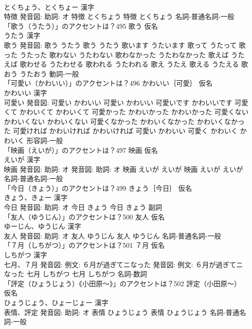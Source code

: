 \documentclass[8pt]{extreport}
\begin{document}
\begin{CJK}{UTF8}{min}
\\	とくちょう、とくちょー 漢字　
\\	特徴 発音図: 助詞: オ	特徴 とくちょう		特徴 とくちょう				名詞-普通名詞-一般 
\\	「歌う（うたう）」のアクセントは？495	歌う 仮名　
\\	うたう 漢字　
\\	歌う 発音図:	歌う うたう		歌う うたう 歌います うたいます 歌って うたって 歌った うたった 歌わない うたわない 歌わなかった うたわなかった 歌えば うたえば 歌わせる うたわせる 歌われる うたわれる 歌え うたえ 歌える うたえる 歌おう うたおう				動詞-一般 
\\	「可愛い（かわいい）」のアクセントは？496	かわいい｛可愛｝ 仮名　
\\	かわいい 漢字　
\\	可愛い 発音図:	可愛い かわいい		可愛い かわいい 可愛いです かわいいです 可愛くて かわいくて かわいくて 可愛かった かわいかった かわいかった 可愛くない かわいくない かわいくない 可愛くなかった かわいくなかった かわいくなかった 可愛ければ かわいければ かわいければ 可愛い かわいい 可愛く かわいく かわいく				形容詞-一般 
\\	「映画（えいが）」のアクセントは？497	映画 仮名　
\\	えいが 漢字　
\\	映画 発音図: 助詞: オ 発音図: 助詞: オ	映画 えいが えいが		映画 えいが えいが				名詞-普通名詞-一般 
\\	「今日（きょう）」のアクセントは？499	きょう｛今日｝ 仮名　
\\	きょう、きょー 漢字　
\\	今日 発音図: 助詞: オ	今日 きょう		今日 きょう				副詞 
\\	「友人（ゆうじん）」のアクセントは？500	友人 仮名　
\\	ゆーじん、ゆうじん 漢字　
\\	友人 発音図: 助詞: オ	友人 ゆうじん		友人 ゆうじん				名詞-普通名詞-一般 
\\	「７月（しちがつ）」のアクセントは？501	７月 仮名　
\\	しちがつ 漢字　
\\	七月、７月 発音図: 例文: ６月が過ぎてニなった 発音図: 例文: ６月が過ぎてニなった	七月 しちがつ		七月 しちがつ				名詞-数詞 
\\	「評定（ひょうじょう）《小田原〜》」のアクセントは？502	評定（小田原〜） 仮名　
\\	ひょうじょう、ひょーじょー 漢字　
\\	表情、評定 発音図: 助詞: オ	表情 ひょうじょう		表情 ひょうじょう				名詞-普通名詞-一般 

\end{CJK}
\end{document}
